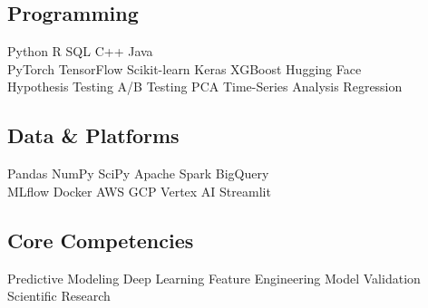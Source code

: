 \documentclass[../main.tex]{subfiles}
\begin{document}
\subsection{Programming}
Python \textbullet{} R \textbullet{} SQL \textbullet{} C++ \textbullet{} Java \\
PyTorch \textbullet{} TensorFlow \textbullet{} Scikit-learn \textbullet{} Keras \textbullet{} XGBoost \textbullet{} Hugging Face \\
Hypothesis Testing \textbullet{} A/B Testing \textbullet{} PCA \textbullet{} Time-Series Analysis \textbullet{} Regression \\

\subsection{Data \& Platforms}
Pandas \textbullet{} NumPy \textbullet{} SciPy \textbullet{} Apache Spark \textbullet{} BigQuery \\
MLflow \textbullet{} Docker \textbullet{} AWS \textbullet{} GCP Vertex AI \textbullet{} Streamlit \\

\subsection{Core Competencies}
Predictive Modeling \textbullet{} Deep Learning \textbullet{} Feature Engineering \textbullet{} Model Validation \textbullet{} Scientific Research
\end{document}
